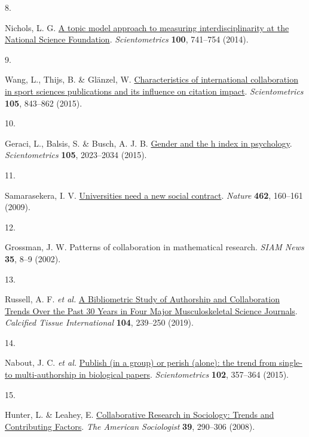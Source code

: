 \documentclass[
  man,floatsintext]{apa6}
\newlength{\cslhangindent}
\newlength{\csllabelwidth}
\newlength{\cslentryspacingunit} %
\newenvironment{CSLReferences}[2] %
 {%
  \setlength{\parindent}{0pt}
  \ifodd #1
  \let\oldpar\par
  \def\par{\hangindent=\cslhangindent\oldpar}
  \fi
  \setlength{\parskip}{#2\cslentryspacingunit}
 }%
 {}
\newcommand{\CSLLeftMargin}[1]{\parbox[t]{\csllabelwidth}{#1}}
\newcommand{\CSLRightInline}[1]{\parbox[t]{\linewidth - \csllabelwidth}{#1}\break}
\begin{document}
\begin{CSLReferences}{0}{0}
\leavevmode{}%
\CSLLeftMargin{8. }%
\CSLRightInline{Nichols, L. G. \href{https://doi.org/10.1007/s11192-014-1319-2}{A topic model approach to measuring interdisciplinarity at the National Science Foundation}. \emph{Scientometrics} \textbf{100}, 741--754 (2014).}

\leavevmode{}%
\CSLLeftMargin{9. }%
\CSLRightInline{Wang, L., Thijs, B. \& Glänzel, W. \href{https://doi.org/10.1007/s11192-015-1735-y}{Characteristics of international collaboration in sport sciences publications and its influence on citation impact}. \emph{Scientometrics} \textbf{105}, 843--862 (2015).}

\leavevmode{}%
\CSLLeftMargin{10. }%
\CSLRightInline{Geraci, L., Balsis, S. \& Busch, A. J. B. \href{https://doi.org/10.1007/s11192-015-1757-5}{Gender and the h index in psychology}. \emph{Scientometrics} \textbf{105}, 2023--2034 (2015).}

\leavevmode{}%
\CSLLeftMargin{11. }%
\CSLRightInline{Samarasekera, I. V. \href{https://doi.org/10.1038/462160a}{Universities need a new social contract}. \emph{Nature} \textbf{462}, 160--161 (2009).}

\leavevmode{}%
\CSLLeftMargin{12. }%
\CSLRightInline{Grossman, J. W. Patterns of collaboration in mathematical research. \emph{SIAM News} \textbf{35}, 8--9 (2002).}

\leavevmode{}%
\CSLLeftMargin{13. }%
\CSLRightInline{Russell, A. F. \emph{et al.} \href{https://doi.org/10.1007/s00223-018-0492-3}{A Bibliometric Study of Authorship and Collaboration Trends Over the Past 30 Years in Four Major Musculoskeletal Science Journals}. \emph{Calcified Tissue International} \textbf{104}, 239--250 (2019).}

\leavevmode{}%
\CSLLeftMargin{14. }%
\CSLRightInline{Nabout, J. C. \emph{et al.} \href{https://doi.org/10.1007/s11192-014-1385-5}{Publish (in a group) or perish (alone): the trend from single- to multi-authorship in biological papers}. \emph{Scientometrics} \textbf{102}, 357--364 (2015).}

\leavevmode{}%
\CSLLeftMargin{15. }%
\CSLRightInline{Hunter, L. \& Leahey, E. \href{https://doi.org/10.1007/s12108-008-9042-1}{Collaborative Research in Sociology: Trends and Contributing Factors}. \emph{The American Sociologist} \textbf{39}, 290--306 (2008).}


\end{CSLReferences}
\end{document}
